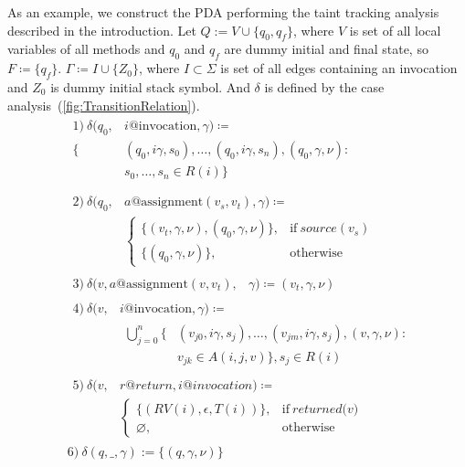 As an example, we construct the PDA performing the taint tracking analysis described in the introduction.
Let $Q := V \cup \{q_0, q_f\}$, where $V$ is set of all local variables of all methods and $q_0$ and $q_f$ are dummy initial and final state, so $F \coloneqq \{q_f\}$.
$\Gamma \coloneqq I \cup \{Z_0\}$, where $I \subset \Sigma$ is set of all edges containing an invocation and $Z_0$ is dummy initial stack symbol.
And $\delta$ is defined by the case analysis~(\ref{fig:TransitionRelation}).
\begin{equation}
    \label{fig:TransitionRelation}
    \begin{split}
        &\begin{split}
            1)\ \delta(q_0, & i@\textrm{invocation}, \gamma) \coloneqq \\
            \{& (q_0, i\gamma, s_0), \ldots, (q_0, i\gamma, s_n), (q_0, \gamma, \nu): \\
            & s_0, \ldots, s_n \in R(i)\} \\
        \end{split} \\
        &\begin{split}
            2)\ \delta(q_0, & a@\textrm{assignment} (v_s, v_t), \gamma) \coloneqq \\
            &\begin{cases}
                \{(v_t, \gamma, \nu), (q_0, \gamma, \nu)\},& \textrm{if}\ \textit{source}(v_s) \\
                \{(q_0, \gamma, \nu)\},& \textrm{otherwise}
            \end{cases}
        \end{split} \\
        &\begin{split}
            3)\ \delta(v, a@\textrm{assignment}(v, v_t), & \gamma) \coloneqq {(v_t, \gamma, \nu)}
        \end{split} \\
        &\begin{split}
            4)\ \delta(v, & i@\textrm{invocation}, \gamma) \coloneqq \\
            &\begin{split}
                \bigcup_{j=0}^{n} \{&(v_{j0}, i\gamma, s_j), \ldots, (v_{jm}, i\gamma, s_j), (v, \gamma, \nu): \\
                & v_{jk} \in A(i, j, v)\}, s_j \in R(i)
            \end{split}
        \end{split} \\
        &\begin{split}
            5)\ \delta(v, & r@return, i@invocation) \coloneqq \\
            &\begin{cases}
                \{(RV(i), \epsilon, T(i))\},& \textrm{if}\ \textit{returned(v)} \\
                \varnothing, & \textrm{otherwise}
            \end{cases}
        \end{split} \\
        & 6)\ \delta(q, \_, \gamma) := \{(q, \gamma, \nu)\}
    \end{split}
\end{equation}
